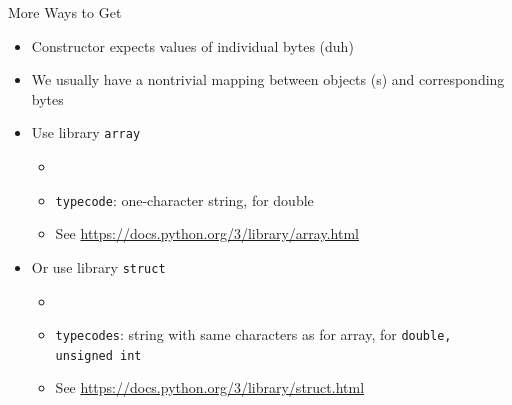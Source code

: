 \begin{frame}{More Ways to Get }
%
\begin{itemize}
\item {} Constructor expects values of individual bytes (duh)
\item We usually have a nontrivial mapping between objects (\zB {}s) and corresponding bytes
\item Use library \texttt{array}
	\begin{itemize}
	\item {}
	\item \texttt{typecode}: one-character string, \zB {} for double
	\item See \url{https://docs.python.org/3/library/array.html}
	\end{itemize}
\item Or use library \texttt{struct}
	\begin{itemize}
	\item {}
	\item \texttt{typecodes}: string with same characters as for array, \zB {} for \texttt{{double, unsigned int}}
	\item See \url{https://docs.python.org/3/library/struct.html}
	\end{itemize}
\end{itemize}
%
\end{frame}


